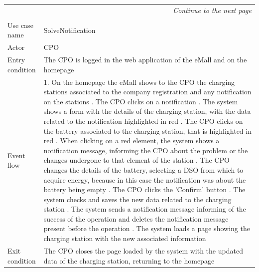 \begin{center}
    \begin{longtable}{p{4cm} p{11cm}}
    \multicolumn{2}{r}{\itshape{Continue to the next page}}\\
    \endfoot 
    \\
    \endlastfoot
    \hline
     Use case name &  SolveNotification\\ %
     \hline
     Actor & CPO \\
     \hline
     Entry condition & The CPO is logged in the web application of the eMall and on the homepage \\
     \hline
     Event flow &   1. On the homepage the eMall shows to the CPO the charging stations associated to the company                   registration and any notification on the stations \newline
                    2. The CPO clicks on a notification \newline 
                    3. The system shows a form with the details of the charging station, with the data related to the notification highlighted in red  \newline
                    4. The CPO clicks on the battery associated to the charging station, that is highlighted in red \newline
                    5. When clicking on a red element, the system shows a notification message, informing the CPO about the problem or the changes undergone to that element of the station \newline
                    6. The CPO changes the details of the battery, selecting a DSO from which to acquire energy, because in this case the notification was about the battery being empty \newline
                    7. The CPO clicks the 'Confirm' button \newline
                    8. The system checks and saves the new data related to the charging station \newline
                    9. The system sends a notification message informing of the success of the operation and deletes the notification message present before the operation \newline
                    10. The system loads a page showing the charging station with the new associated information\\
     \hline
     Exit condition &  The CPO closes the page loaded by the system with the updated data of the charging station, returning to the homepage \\

\end{longtable}
\end{center}
